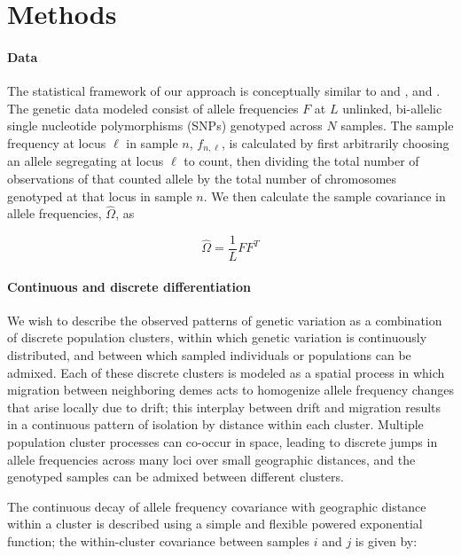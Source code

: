 \documentclass[12pt]{article}
\begin{document}
\section*{Methods}
\paragraph{Data}
The statistical framework of our approach is conceptually similar to \cite{Wasser2004} and \cite{BEDASSLE}, and \cite{spacemix}.
The genetic data modeled consist of allele frequencies $F$ at $L$ unlinked, bi-allelic single nucleotide polymorphisms (SNPs) genotyped across $N$ samples.
The sample frequency at locus $\ell$ in sample $n$, $f_{n,\ell}$, is calculated by first arbitrarily choosing an allele segregating 
at locus $\ell$ to count, 
then dividing the total number of observations of that counted allele by the total number of chromosomes genotyped at that locus
in sample $n$.
We then calculate the sample covariance in allele frequencies, $\widehat{\Omega}$, as

\begin{equation}
\widehat{\Omega} = \frac{1}{L}  FF^T
\label{sample_covariance}
\end{equation}

\paragraph{Continuous and discrete differentiation}
We wish to describe the observed patterns of genetic variation as a combination of 
discrete population clusters,
within which genetic variation is continuously distributed, 
and between which sampled individuals or populations can be admixed.
Each of these discrete clusters is modeled as a spatial process
in which migration between neighboring demes acts 
to homogenize allele frequency changes that arise locally due to drift;
this interplay between drift and migration 
results in a continuous pattern of isolation by distance within each cluster.
Multiple population cluster processes can co-occur in space, 
leading to discrete jumps in allele frequencies across many loci over small geographic distances,
and the genotyped samples can be admixed between different clusters.

The continuous decay of allele frequency covariance with geographic distance 
within a cluster is described using a simple and flexible powered exponential function;
the within-cluster covariance between samples $i$ and $j$ is given by:
\end{document}
